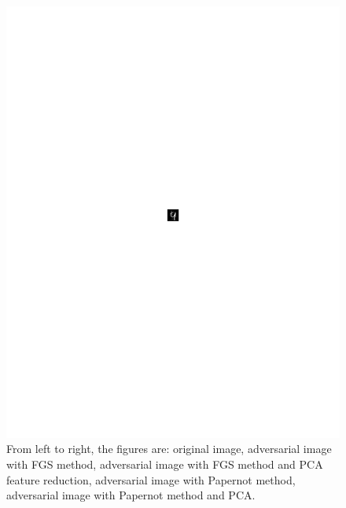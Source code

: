 \begin{figure}[b]
\begin{minipage}{.09\textwidth}
\end{minipage}
\begin{minipage}{.09\textwidth}
	\centering
    \includegraphics[width =0.9\linewidth, trim = 300 400 300 375, clip]{figs/papernot9pca.pdf}
\end{minipage}
\caption{From left to right, the figures are: original image, adversarial image with FGS method, adversarial image with FGS method and PCA feature reduction, adversarial image with Papernot method, adversarial image with Papernot method and PCA.}\label{fig:picof9s}
\end{figure}